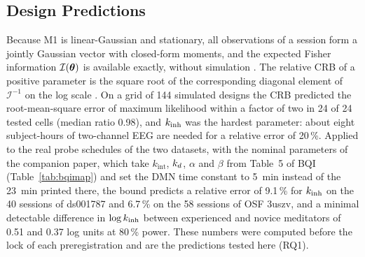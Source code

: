 \subsection{Design Predictions}
\label{sec:predictions}
Because M1 is linear-Gaussian and stationary, all observations of a session form a jointly Gaussian vector with closed-form moments, and the expected Fisher information $\mathcal I(\boldsymbol{\theta})$ is available exactly, without simulation \cite{companion}. The relative CRB of a positive parameter is the square root of the corresponding diagonal element of $\mathcal I^{-1}$ on the log scale \cite{Rao1945,Cramer1946}. On a grid of 144 simulated designs the CRB predicted the root-mean-square error of maximum likelihood within a factor of two in 24 of 24 tested cells (median ratio 0.98), and $k_{\mathrm{inh}}$ was the hardest parameter: about eight subject-hours of two-channel EEG are needed for a relative error of 20\,\%. Applied to the real probe schedules of the two datasets, with the nominal parameters of the companion paper, which take $k_{\mathrm{int}}$, $k_{d}$, $\alpha$ and $\beta$ from Table~5 of BQI \cite{BQI} (Table~\ref{tab:bqimap}) and set the DMN time constant to 5~min instead of the 23~min printed there, the bound predicts a relative error of 9.1\,\% for $k_{\mathrm{inh}}$ on the 40 sessions of ds001787 and 6.7\,\% on the 58 sessions of OSF 3uszv, and a minimal detectable difference in $\log k_{\mathrm{inh}}$ between experienced and novice meditators of 0.51 and 0.37 log units at 80\,\% power. These numbers were computed before the lock of each preregistration and are the predictions tested here (RQ1).

